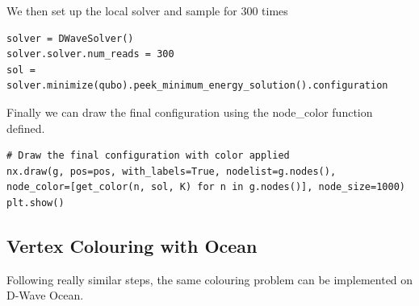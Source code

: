 We then set up the local solver and sample for 300 times
\begin{verbatim}
solver = DWaveSolver() 
solver.solver.num_reads = 300 
sol = solver.minimize(qubo).peek_minimum_energy_solution().configuration 
\end{verbatim}
Finally we can draw the final configuration using the node\_color function defined.
\begin{verbatim}
# Draw the final configuration with color applied
nx.draw(g, pos=pos, with_labels=True, nodelist=g.nodes(),  
node_color=[get_color(n, sol, K) for n in g.nodes()], node_size=1000) 
plt.show() 
\end{verbatim}

\subsection{Vertex Colouring with Ocean}
Following really similar steps, the same colouring problem can be implemented on D-Wave Ocean.

\inputminted{python}{code/dwave/colouring_ocean.txt}

